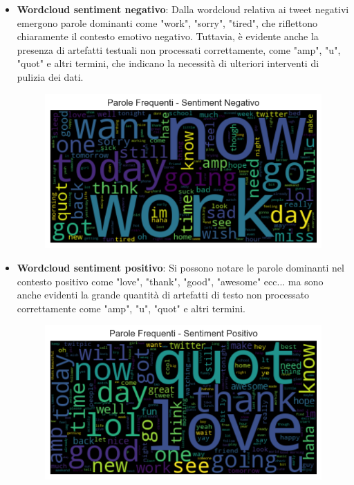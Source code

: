 \documentclass[12pt,a4paper]{report} %
\begin{document}
 \begin{itemize}
     \item \textbf{Wordcloud sentiment negativo}: Dalla wordcloud relativa ai tweet negativi emergono parole dominanti come "work", "sorry", "tired", che riflettono chiaramente il contesto emotivo negativo. Tuttavia, è evidente anche la presenza di artefatti testuali non processati correttamente, come "amp", "u", "quot" e altri termini, che indicano la necessità di ulteriori interventi di pulizia dei dati. 
\begin{figure}[H]
    \centering
    \includegraphics[width=0.75\linewidth]{immagini/understanding_wordclound_negativo.png}
  
    \label{fig:enter-label}
\end{figure}
 \end{itemize}
 \begin{itemize}
     \item \textbf{Wordcloud sentiment positivo}: Si possono notare le parole dominanti nel contesto positivo come "love", "thank", "good", "awesome" ecc... ma sono anche evidenti la grande quantità di artefatti di testo non processato correttamente come "amp", "u", "quot" e altri termini.
\begin{figure}[H]
    \centering
    \includegraphics[width=0.75\linewidth]{immagini/understanding_wordcloud_positivo.png}
    \label{fig:enter-label}
\end{figure}
 \end{itemize}
\end{document}

